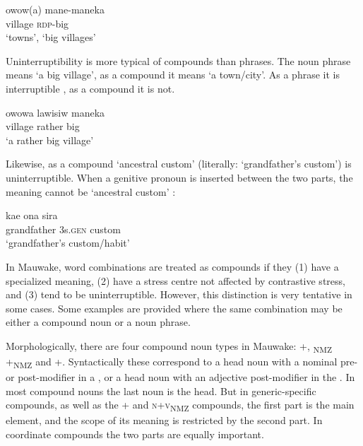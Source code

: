 \ea%
\label{ex:3:x35}
\gll owow(a) mane-maneka \\
village \textsc{rdp}-big\\
\glt`towns', `big villages'
\z

Uninterruptibility is more typical of compounds than phrases. The noun phrase  means `a big village', as a compound it means `a town/city'. As a phrase it is interruptible , as a compound it is not.

\ea%
\label{ex:3:x1768}
\gll owowa lawisiw maneka \\
village rather big\\
\glt`a rather big village'
\z

Likewise, as a compound  `ancestral custom' (literally: `grandfather's custom') is uninterruptible. When a genitive pronoun is inserted between the two parts, the meaning cannot be `ancestral custom' :

\ea%
\label{ex:3:x1860}
\gll kae ona sira \\
grandfather 3s.\textsc{gen} custom\\
\glt`grandfather's custom/habit'
\z

In Mauwake, word combinations are treated as compounds if they (1) have a specialized meaning, (2) have a stress centre not affected by contrastive stress, and (3) tend to be uninterruptible. However, this distinction is very tentative in some cases. Some examples are provided where  the same combination may be either a compound noun or a noun phrase.

Morphologically, there are four compound noun types in Mauwake: +, \textsubscript{NMZ}\textstyleAcronymallcaps{} +\textsubscript{NMZ}\textstyleAcronymallcaps{ } and +. Syntactically these correspond to a head noun with a nominal pre- or post-modifier in a , or a head noun with an adjective post-modifier in the . In most compound nouns the last noun is the head. But in generic-specific compounds, as well as the + and\textstyleAcronymallcaps{} \textsc{n+v}\textsubscript{NMZ} compounds, the first part is the main element, and the scope of its meaning is restricted by the second part. In coordinate compounds the two parts are equally important.

